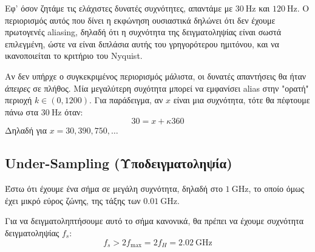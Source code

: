 \documentclass[11pt,a4paper,notitlepage,fleqn,draft]{article}
\let\mytodo\todo
\renewcommand{\todo}[1]{\par\mytodo[inline,noline]{#1}}
\begin{document}
\begin{exercise}
	Εφ' όσον ζητάμε τις ελάχιστες δυνατές συχνότητες, απαντάμε με \( \SI{30}{\hertz} \) και \( \SI{120}{\hertz} \).
	Ο περιορισμός αυτός που δίνει η εκφώνηση ουσιαστικά δηλώνει ότι δεν έχουμε πρωτογενές aliasing, δηλαδή
	ότι η συχνότητα της δειγματοληψίας είναι σωστά επιλεγμένη, ώστε να είναι διπλάσια αυτής του
	γρηγορότερου ημιτόνου, και να ικανοποιείται το κριτήριο του Nyquist.
	
	Αν δεν υπήρχε ο συγκεκριμένος περιορισμός μάλιστα, οι δυνατές απαντήσεις θα ήταν \emph{άπειρες}
	σε πλήθος. Μία μεγαλύτερη συχότητα μπορεί να εμφανίσει alias στην "ορατή" περιοχή \( k \in (0,1200) \). Για παράδειγμα, αν \( x \) είναι μια συχνότητα, τότε θα πέφτουμε πάνω στα \( \SI{30}{\hertz} \)
	όταν:
	\[
	30 = x + κ360
	\]
	Δηλαδή για \( x=30,390,750,\dots \)
	
	\todo{solve in another way}
\end{exercise}


\subsection{Under-Sampling (Υποδειγματοληψία)}

\begin{center}
\end{center}

Έστω ότι έχουμε ένα σήμα σε μεγάλη συχνότητα, δηλαδή στο \( \SI{1}{\giga\hertz} \), το οποίο όμως έχει μικρό
εύρος ζώνης, της τάξης των \( \SI{0.01}{\giga\hertz} \).

Για να δειγματοληπτήσουμε αυτό το σήμα κανονικά, θα πρέπει να έχουμε συχνότητα δειγματοληψίας \( f_s \):
\[
f_s > 2 f_{\max} = 2f_H = \SI{2.02}{\giga\hertz}
\]
\end{document}

